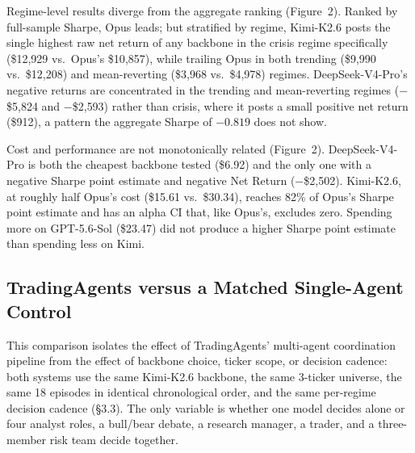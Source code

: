 \documentclass{article}
\begin{document}
Regime-level results diverge from the aggregate ranking (Figure~2). Ranked by full-sample Sharpe, Opus leads; but stratified by regime, Kimi-K2.6 posts the single highest raw net return of any backbone in the crisis regime specifically (\$12{,}929 vs.\ Opus's \$10{,}857), while trailing Opus in both trending (\$9{,}990 vs.\ \$12{,}208) and mean-reverting (\$3{,}968 vs.\ \$4{,}978) regimes. DeepSeek-V4-Pro's negative returns are concentrated in the trending and mean-reverting regimes ($-$\$5{,}824 and $-$\$2{,}593) rather than crisis, where it posts a small positive net return (\$912), a pattern the aggregate Sharpe of $-0.819$ does not show.

Cost and performance are not monotonically related (Figure~2). DeepSeek-V4-Pro is both the cheapest backbone tested (\$6.92) and the only one with a negative Sharpe point estimate and negative Net Return ($-$\$2{,}502). Kimi-K2.6, at roughly half Opus's cost (\$15.61 vs.\ \$30.34), reaches 82\% of Opus's Sharpe point estimate and has an alpha CI that, like Opus's, excludes zero. Spending more on GPT-5.6-Sol (\$23.47) did not produce a higher Sharpe point estimate than spending less on Kimi.

\subsection{TradingAgents versus a Matched Single-Agent Control}

This comparison isolates the effect of TradingAgents' multi-agent coordination pipeline from the effect of backbone choice, ticker scope, or decision cadence: both systems use the same Kimi-K2.6 backbone, the same 3-ticker universe, the same 18 episodes in identical chronological order, and the same per-regime decision cadence (\S3.3). The only variable is whether one model decides alone or four analyst roles, a bull/bear debate, a research manager, a trader, and a three-member risk team decide together.

\begin{table}[h]
  \caption{TradingAgents versus a matched single-agent Kimi-K2.6 control.}
  \label{tab:coordination}
  \centering
\end{table}
\end{document}
